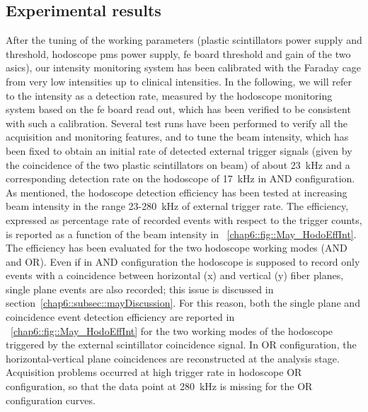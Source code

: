 \subsection{Experimental results}\label{chap6::subsec::mayResults} 
After the tuning of the working parameters (plastic scintillators power supply and threshold, hodoscope \glspl{pm} power supply, \gls{fe} board threshold and gain of the two \glspl{asic}), our intensity monitoring system has been calibrated with the Faraday cage from very low intensities up to clinical intensities. In the following, we will refer to the intensity as a detection rate, measured by the hodoscope monitoring system based on the \gls{fe} board read out, which has been verified to be consistent with such a calibration.
Several test runs have been performed to verify all the acquisition and monitoring features, and to tune the beam intensity, which has been fixed to obtain an initial rate of detected external trigger signals (given by the coincidence of the two plastic scintillators on beam) of about 23~kHz and a corresponding detection rate on the hodoscope of 17~kHz in AND configuration.
As mentioned, the hodoscope detection efficiency has been tested at increasing beam intensity in the range 23-280~kHz of external trigger rate. The efficiency, expressed as percentage rate of recorded events with respect to the trigger counts, is reported as a function of the beam intensity in \figurename~\ref{chap6::fig::May_HodoEffInt}. The efficiency has been evaluated for the two hodoscope working modes (AND and OR). Even if in AND configuration the hodoscope is supposed to record only events with a coincidence between horizontal (x) and vertical (y) fiber planes, single plane events are also recorded; this issue is discussed in section~\ref{chap6::subsec::mayDiscussion}. For this reason, both the single plane and coincidence event detection efficiency are reported in \figurename~\ref{chap6::fig::May_HodoEffInt} for the two working modes of the hodoscope triggered by the external scintillator coincidence signal. In OR configuration, the horizontal-vertical plane coincidences are reconstructed at the analysis stage. Acquisition problems occurred at high trigger rate in hodoscope OR configuration, so that the data point at 280~kHz is missing for the OR configuration curves. 

